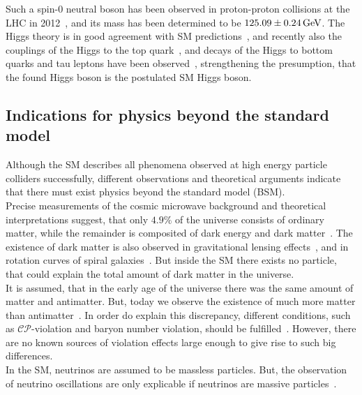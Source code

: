 Such a spin-0 neutral boson has been observed in proton-proton collisions at the LHC in 2012~\cite{HiggsCMS,HiggsATLAS}, and its mass has been determined to be $125.09\pm0.24\,\text{Ge\hspace{-.08em}V}$. The Higgs theory is in good agreement with SM predictions~\cite{HiggsPrecise}, and recently also the couplings of the Higgs to the top quark~\cite{ttH}, and decays of the Higgs to bottom quarks and tau leptons have been observed~\cite{HiggsTauTau,HiggsBB}, strengthening the presumption, that the found Higgs boson is the postulated SM Higgs boson.



\subsection{Indications for physics beyond the standard model}\label{sec:SM_bsm}
Although the SM describes all phenomena observed at high energy particle colliders successfully, different observations and theoretical arguments indicate that there must exist physics beyond the standard model (BSM).\\
Precise measurements of the cosmic microwave background and theoretical interpretations suggest, that only $4.9\%$ of the universe consists of ordinary matter, while the remainder is composited of dark energy and dark matter~\cite{DarkMatterPlanck}. The existence of dark matter is also observed in gravitational lensing effects~\cite{DarkMatterLensing}, and in rotation curves of spiral galaxies~\cite{DarkMatterRotation}. But inside the SM there exists no particle, that could explain the total amount of dark matter in the universe.\\
It is assumed, that in the early age of the universe there was the same amount of matter and antimatter. But, today we observe the existence of much more matter than antimatter~\cite{Antimatter,AsymSM}. In order do explain this discrepancy, different conditions, such as $\mathcal{CP}$-violation and baryon number violation, should be fulfilled~\cite{Sakharov}. However, there are no known sources of violation effects large enough to give rise to such big differences.\\
In the SM, neutrinos are assumed to be massless particles. But, the observation of neutrino oscillations are only explicable if neutrinos are massive particles~\cite{NeutrinoMass,PDG}.\\
